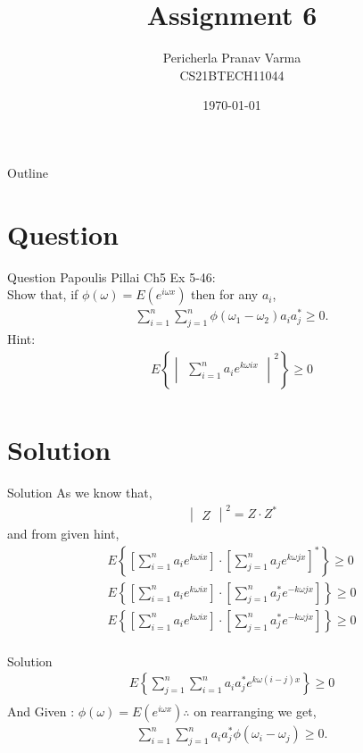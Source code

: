 \documentclass{beamer}
\title{Assignment 6}
\author{Pericherla Pranav Varma\\CS21BTECH11044}
\date{\today}
\providecommand{\cbrak}[1]{\ensuremath{\left\{#1\right\}}}
\newcommand{\mydet}[1]{\ensuremath{\begin{vmatrix}#1\end{vmatrix}}}
\providecommand{\cbrak}[1]{\ensuremath{\left\{#1\right\}}}
\providecommand{\sbrak}[1]{\ensuremath{{}\left[#1\right]}}
\begin{document}
    \begin{frame}
        \titlepage 
    \end{frame}

    \begin{frame}{Outline}
        \tableofcontents
    \end{frame}

    \section{Question}
    	\begin{frame}{Question}
    	Papoulis Pillai Ch5 Ex 5-46:\\[9pt]
    Show that, if $\phi(\omega)=E(e^{i \omega x})$ then for any $a_i$,\\[6pt]
   	\begin{align*}
   	\sum^{n}_{i=1} \sum^{n}_{j=1}  \phi(\omega_1 - \omega_2) a_i a^*_j \ge 0.
   	\end{align*}
	Hint:\\	
	\begin{align*}
	E \cbrak{ \mydet{ \sum^{n}_{i=1} a_i e^{k \omega i x}}^2 } \ge 0 \\
	\end{align*} 
  
    	\end{frame}
%    
    \section{Solution}
        \begin{frame}{Solution}
        As we know that,
        \begin{align*}
        \mydet{Z}^2 = Z \cdot Z^*
        \end{align*}
        and from given hint,
        \begin{align*}
        E \cbrak{ \sbrak{ \sum^{n}_{i=1} a_i e^{k \omega i x}} \cdot \sbrak {\sum^{n}_{j=1} a_j e^{k \omega j x}}^*} \ge 0\\
       E \cbrak{ \sbrak{ \sum^{n}_{i=1} a_i e^{k \omega i x}} \cdot \sbrak {\sum^{n}_{j=1} a^*_j e^{-k \omega j x}}} \ge 0\\ 
       E \cbrak{ \sbrak{ \sum^{n}_{i=1} a_i e^{k \omega i x}} \cdot \sbrak {\sum^{n}_{j=1} a^*_j e^{-k \omega j x}}} \ge 0\\
        \end{align*}
        \end{frame}
    \begin{frame}{Solution}
	\begin{align*}
	E \cbrak{ \sum^{n}_{j=1} \sum^{n}_{i=1} a_i a^*_j e^{k \omega (i-j) x}} \ge 0\\
	\end{align*}	    
And Given : $\phi(\omega)=E(e^{i \omega x}) \therefore$ on rearranging we get,
	\begin{align*}
	\sum^{n}_{i=1} \sum^{n}_{j=1} a_i a^*_j \phi(\omega_i - \omega_j) \ge 0.
	\end{align*}
 
    \end{frame}
\end{document}
